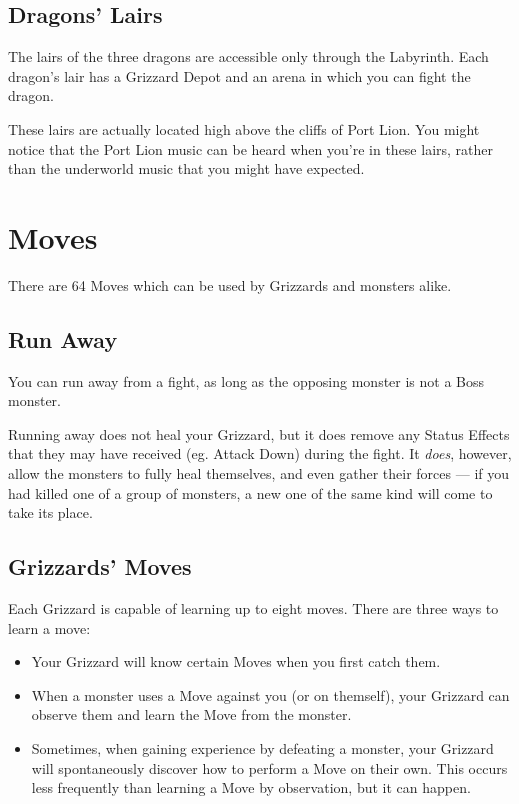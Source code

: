 \documentclass[10pt,twocolumn]{memoir}
\begin{document}
\section{Dragons' Lairs}

The   lairs  of   the  three   dragons  are   accessible  only   through
the Labyrinth. Each  dragon's lair has a Grizzard Depot  and an arena in
which you can fight the dragon.

These lairs  are actually located  high above  the cliffs of  Port Lion.
You might notice  that the Port Lion  music can be heard  when you're in
these  lairs,   rather  than  the   underworld  music  that   you  might
have expected.

\chapter{Moves}\label{ch:Moves}

There are 64 Moves which can be used by Grizzards and monsters alike.

\section{Run Away}

You can run away from a fight, as long as the opposing monster is not a
Boss monster.

Running away does not heal your  Grizzard, but it does remove any Status
Effects that they may have received  (eg. Attack Down) during the fight.
It \emph{does},  however, allow the  monsters to fully  heal themselves,
and even  gather their forces ---  if you had  killed one of a  group of
monsters, a new one of the same kind will come to take its place.

\section{Grizzards' Moves}\label{sec:GrizzardMoves}

Each Grizzard is capable of learning  up to eight moves. There are three
ways to learn a move:

\begin{itemize}
\item Your Grizzard will know certain Moves when you first catch them.
\item When  a monster  uses a  Move against you  (or on  themself), your
  Grizzard can observe them and learn the Move from the monster.
\item Sometimes,  when gaining experience  by defeating a  monster, your
  Grizzard  will  spontaneously  discover  how  to  perform  a  Move  on
  their  own.  This occurs  less  frequently  than  learning a  Move  by
  observation, but it can happen.
\end{itemize}
\end{document}

